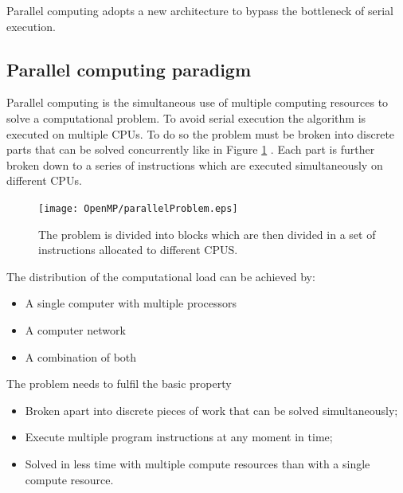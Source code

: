 Parallel computing adopts a new architecture to bypass the bottleneck of
serial execution.

\subsection{Parallel computing paradigm}
Parallel computing is the simultaneous use of multiple computing resources
to solve a computational problem.
To avoid serial execution the algorithm is executed on multiple CPUs.
To do so the problem must be broken into discrete parts that can be
 solved concurrently like in Figure \ref{Fig:Parallel:parallelProblem} .
Each part is further broken down to a series of instructions which are executed
simultaneously on different CPUs.

\begin{figure}[htbp]
\begin{center}
\texttt{[image: OpenMP/parallelProblem.eps]}
\end{center}
\small{
\caption[Serial Problem computation]{
The problem is divided into blocks which are then divided in a set of instructions
allocated to different CPUS.
\label{Fig:Parallel:parallelProblem}}}
\end{figure}

The distribution of the computational load can be achieved by:
\begin{itemize}
\item  A single computer with multiple processors
\item  A computer network
\item  A combination of both
\end{itemize}

The problem needs to fulfil the basic property
\begin{itemize}
\item  Broken apart into discrete pieces of work that can be solved simultaneously;
\item Execute multiple program instructions at any moment in time;
\item Solved in less time with multiple compute resources than with a single compute resource.
\end{itemize}

